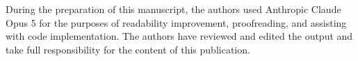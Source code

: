 \documentclass{article}
\begin{document}
During the preparation of this manuscript, the authors used Anthropic Claude Opus 5 for the purposes of readability improvement, proofreading, and assisting with code implementation. The authors have reviewed and edited the output and take full responsibility for the content of this publication.

  
  
\end{document}
